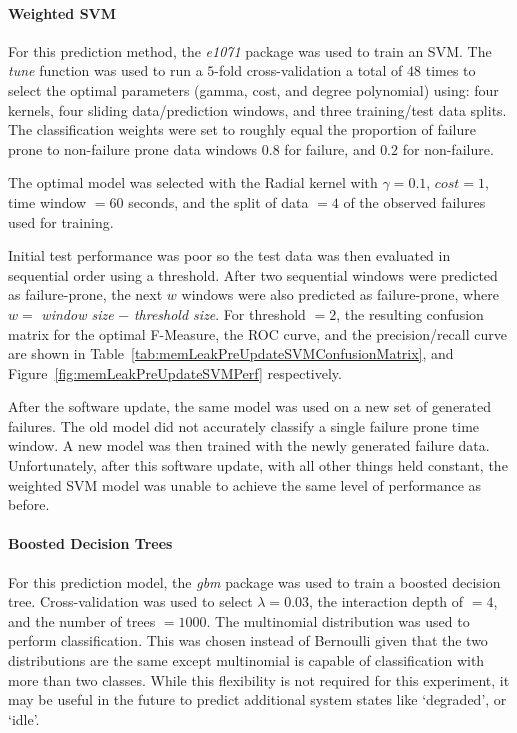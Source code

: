 \paragraph{Weighted \ac{SVM}}
For this prediction method, the \emph{e1071} package was used to train an
\ac{SVM}.  The \emph{tune} function was used to run a $5$-fold cross-validation
a total of $48$ times to select the optimal parameters (gamma, cost, and degree
polynomial) using: four kernels, four sliding data/prediction windows, and
three training/test data splits.  The classification weights were set to
roughly equal the proportion of failure prone to non-failure prone data windows
$0.8$ for failure, and $0.2$ for non-failure.

The optimal model was selected with the Radial kernel with $\gamma = 0.1$,
$cost = 1$, time window $= 60$ seconds, and the split of data $= 4$ of the
observed failures used for training.

Initial test performance was poor so the test data was then evaluated in
sequential order using a threshold.  After two sequential windows were
predicted as failure-prone, the next $w$ windows were also predicted as
failure-prone, where $w = $ \emph{window size} $-$ \emph{threshold size}.  For
threshold $= 2$, the resulting confusion matrix for the optimal F-Measure, the
\ac{ROC} curve, and the precision/recall curve are shown in
Table~\ref{tab:memLeakPreUpdateSVMConfusionMatrix}, and
Figure~\ref{fig:memLeakPreUpdateSVMPerf} respectively.

\figMemLeakPreUpdateSVMPerf
\tabMemLeakPreUpdateSVMConfusionMatrix

After the software update, the same model was used on a new set of generated
failures.  The old model did not accurately classify a single failure prone
time window.  A new model was then trained with the newly generated failure
data.  Unfortunately, after this software update, with all other things held
constant, the weighted SVM model was unable to achieve the same level of
performance as before.

\paragraph{Boosted Decision Trees}
For this prediction model, the \emph{gbm} package was used to train a boosted
decision tree.  Cross-validation was used to select $\lambda = 0.03$, the
interaction depth of $= 4$, and the number of trees $= 1000$.  The multinomial
distribution was used to perform classification.  This was chosen instead of
Bernoulli given that the two distributions are the same except multinomial is
capable of classification with more than two classes.  While this flexibility
is not required for this experiment, it may be useful in the future to predict
additional system states like `degraded', or `idle'.

